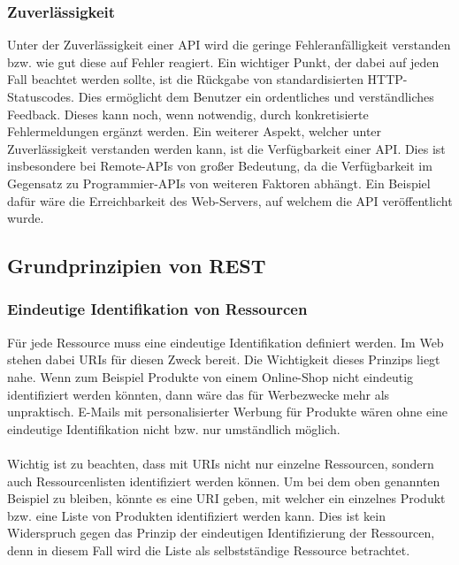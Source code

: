 \subsubsection{Zuverlässigkeit}
Unter der Zuverlässigkeit einer \gls{API} wird die geringe Fehleranfälligkeit verstanden bzw. wie gut diese auf Fehler reagiert. Ein wichtiger Punkt, der dabei auf jeden Fall beachtet werden sollte, ist die Rückgabe von standardisierten HTTP-Statuscodes. Dies ermöglicht dem Benutzer ein ordentliches und verständliches Feedback. Dieses kann noch, wenn notwendig, durch konkretisierte Fehlermeldungen ergänzt werden. Ein weiterer Aspekt, welcher unter Zuverlässigkeit verstanden werden kann, ist die Verfügbarkeit einer \gls{API}. Dies ist insbesondere bei Remote-\glspl{API} von großer Bedeutung, da die Verfügbarkeit im Gegensatz zu Programmier-\glspl{API} von weiteren Faktoren abhängt. Ein Beispiel dafür wäre die Erreichbarkeit des Web-Servers, auf welchem die \gls{API} veröffentlicht wurde.

\subsection{Grundprinzipien von REST}\label{sec:basePrincipleREST}
\subsubsection{Eindeutige Identifikation von Ressourcen}
Für jede Ressource muss eine eindeutige Identifikation definiert werden. Im Web stehen dabei \glspl{URI} für diesen Zweck bereit. Die Wichtigkeit dieses Prinzips liegt nahe. Wenn zum Beispiel Produkte von einem Online-Shop nicht eindeutig identifiziert werden könnten, dann wäre das für Werbezwecke mehr als unpraktisch. E-Mails mit personalisierter Werbung für Produkte wären ohne eine eindeutige Identifikation nicht bzw. nur umständlich möglich.\\
\\
Wichtig ist zu beachten, dass mit \glspl{URI} nicht nur einzelne Ressourcen, sondern auch Ressourcenlisten identifiziert werden können. Um bei dem oben genannten Beispiel zu bleiben, könnte es eine \gls{URI} geben, mit welcher ein einzelnes Produkt bzw. eine Liste von Produkten identifiziert werden kann. Dies ist kein Widerspruch gegen das Prinzip der eindeutigen Identifizierung der Ressourcen, denn in diesem Fall wird die Liste als selbstständige Ressource betrachtet.

